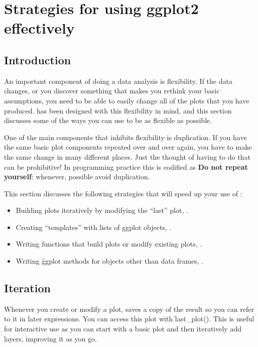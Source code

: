 

\chapter{Strategies for using ggplot2 effectively}

\section{Introduction}

An important component of doing a data analysis is flexibility.  If the data changes, or you discover something that makes you rethink your basic assumptions, you need to be able to easily change all of the plots that you have produced.  \ggplot has been designed with this flexibility in mind, and this section discusses some of the ways you can use \ggplot to be as flexible as possible.

One of the main components that inhibits flexibility is duplication. If you have the same basic plot components repeated over and over again, you have to make the same change in many different places.  Just the thought of having to do that can be prohibitive!  In programming practice this is codified as {\bf Do not repeat yourself}: whenever, possible avoid duplication.

This section discusses the following strategies that will speed up your use of \ggplot:

\begin{itemize}
  \item Building plots iteratively by modifying the ``last'' plot, .

  \item Creating ``templates'' with lists of ggplot objects, .

  \item Writing functions that build plots or modify existing plots, .

  \item Writing \f{ggplot} methods for objects other than data frames, .

\end{itemize}

\section{Iteration}
\label{sec:iteration}

Whenever you create or modify a plot, \ggplot saves a copy of the result so you can refer to it in later expressions.  You can access this plot with \f{last_plot()}.  This is useful for interactive use as you can start with a basic plot and then iteratively add layers, improving it as you go.

